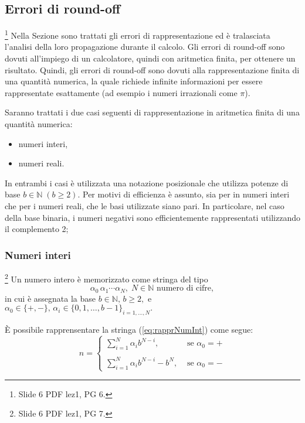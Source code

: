 \subsection{Errori di round-off}\label{ssec:errori_roundoff}\footnote{Slide 6 PDF lez1, PG 6.}
Nella Sezione sono trattati gli errori di rappresentazione ed è tralasciata l'analisi della loro propagazione durante il calcolo. Gli errori di round-off sono dovuti all'impiego di un calcolatore, quindi con aritmetica finita, per ottenere un risultato. Quindi, gli errori di round-off sono dovuti alla rappresentazione finita di una quantità numerica, la quale richiede infinite informazioni  per essere rappresentate esattamente (ad esempio i numeri irrazionali come $\pi$). 

Saranno trattati i due casi seguenti di rappresentazione in aritmetica finita di una quantità numerica:
\begin{itemize}
	\item numeri interi,
	\item numeri reali.
\end{itemize}

In entrambi i casi è utilizzata una notazione posizionale che utilizza potenze di base $b\in\mathbb N\; (b\geq 2)$. Per motivi di efficienza è assunto, sia per in numeri interi che per i numeri reali, che le basi utilizzate siano pari. In particolare, nel caso della base binaria, i numeri negativi sono efficientemente rappresentati utilizzando il complemento 2;

\subsubsection{Numeri interi}\footnote{Slide 6 PDF lez1, PG 7.}
Un numero intero è memorizzato come stringa del tipo
\begin{equation}\label{eq:rapprNumInt}
	\alpha_0\,\alpha_1\cdots\alpha_N,\; N\in\mathbb N\text{ numero di cifre},
\end{equation}
in cui è assegnata la base $b\in\mathbb N,\, b\geq 2,$ e $ \alpha_0\in\{+,-\},\, \alpha_i\in\{0,1,\hdots, b-1\}_{i=1,\hdots,N}.$

È possibile rapprensentare la stringa (\ref{eq:rapprNumInt}) come segue:
\begin{equation}\label{eq:rapprNumIntCompl}
	n=\begin{cases}
		\sum_{i=1}^N\alpha_i b^{N-i}, &\text{ se } \alpha_0=+\\
		\\
		\sum_{i=1}^N\alpha_i b^{N-i} -b^N, &\text{ se } \alpha_0=-
	\end{cases}
\end{equation}

